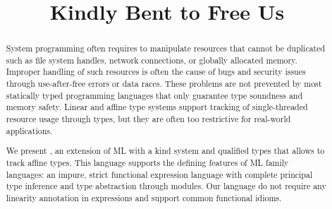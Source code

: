 \documentclass[acmsmall,review,anonymous,table]{acmart}
\begin{document}
\title{Kindly Bent to Free Us}
\begin{abstract}
  System programming often requires to manipulate resources that
  cannot be duplicated such as file system handles, network connections,
  or globally allocated memory.
  Improper handling of such resources is often the cause of bugs and security issues
  through use-after-free errors or data races. These problems are not
  prevented by most statically typed programming languages that only
  guarantee type soundness and memory safety.
  Linear and affine type systems support tracking of single-threaded resource usage
  through types, but they are often too restrictive for real-world applications.

  We present \lang, an extension of ML with a kind system and qualified
  types that allows to track affine types.
  This language supports the defining features of ML family languages:
  an impure, strict functional expression language with complete principal type
  inference and type abstraction through modules.
  Our language do not require any linearity annotation in
  expressions and support common functional idioms.
\end{abstract}


\maketitle













\end{document}
